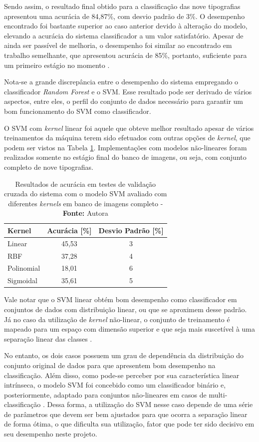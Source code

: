 Sendo assim, o resultado final obtido para a classificação das nove tipografias apresentou uma acurácia de 84,87\%, com desvio padrão de 3\%. O desempenho encontrado foi bastante superior ao caso anterior devido à alteração do modelo, elevando a acurácia do sistema classificador a um valor satisfatório. Apesar de ainda ser passível de melhoria, o desempenho foi similar ao encontrado em trabalho semelhante, que apresentou acurácia de 85\%, portanto, suficiente para um primeiro estágio no momento .

Nota-se a grande discrepância entre o desempenho do sistema empregando o classificador \textit{Random Forest} e o SVM. Esse resultado pode ser derivado de vários aspectos, entre eles, o perfil do conjunto de dados necessário para garantir um bom funcionamento do SVM como classificador.

O SVM com \textit{kernel} linear foi aquele que obteve melhor resultado apesar de vários treinamentos da máquina terem sido efetuados com outras opções de \textit{kernel}, que podem ser vistos na Tabela \ref{tab:svmkernelResults}. Implementações com modelos não-lineares foram realizados somente no estágio final do banco de imagens, ou seja, com conjunto completo de nove tipografias.

\begin{table}[h]
 \centering
 \begin{tabular}{l|c|c}
    Kernel & Acurácia [\%] & Desvio Padrão [\%]\\
	\hline
	Linear &  45,53 & 3 \\
	RBF & 37,28 & 4 \\
	Polinomial & 18,01 & 6  \\
	Sigmoidal & 35,61 & 5 \\
 \end{tabular}
 \caption{Resultados de acurácia em testes de validação cruzada do sistema com o modelo SVM avaliado com diferentes \textit{kernels} em banco de imagens completo - \textbf{Fonte:} Autora}
 \label{tab:svmkernelResults}
\end{table}

Vale notar que o SVM linear obtém bom desempenho como classificador em conjuntos de dados com distribuição linear, ou que se aproximem desse padrão. Já no caso da utilização de \textit{kernel} não-linear, o conjunto de treinamento é mapeado para um espaço com dimensão superior e que seja mais suscetível à uma separação linear das classes .

No entanto, os dois casos possuem um grau de dependência da distribuição do conjunto original de dados para que apresentem bom desempenho na classificação. Além disso, como pode-se perceber por sua característica linear intrínseca, o modelo SVM foi concebido como um classificador binário e, posteriormente, adaptado para conjuntos não-lineares em casos de multi-classificação . Dessa forma, a utilização do SVM nesse caso depende de uma série de parâmetros que devem ser bem ajustados para que ocorra a separação linear de forma ótima, o que dificulta sua utilização, fator que pode ter sido decisivo em seu desempenho neste projeto.

